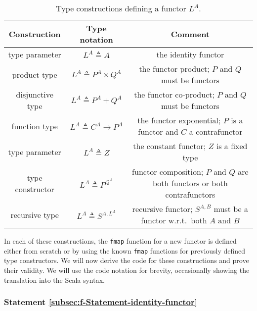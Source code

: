 \begin{table}
\begin{centering}
\begin{tabular}{|c|c|c|}
\hline 
\textbf{\small{}Construction} & \textbf{\small{}Type notation} & \textbf{\small{}Comment}\tabularnewline
\hline 
\hline 
{\footnotesize{}type parameter} & {\footnotesize{}$L^{A}\triangleq A$} & {\footnotesize{}the identity functor}\tabularnewline
\hline 
{\footnotesize{}product type} & {\footnotesize{}$L^{A}\triangleq P^{A}\times Q^{A}$} & {\footnotesize{}the functor product; $P$ and $Q$ must be functors}\tabularnewline
\hline 
{\footnotesize{}disjunctive type} & {\footnotesize{}$L^{A}\triangleq P^{A}+Q^{A}$} & {\footnotesize{}the functor co-product; $P$ and $Q$ must be functors}\tabularnewline
\hline 
{\footnotesize{}function type} & {\footnotesize{}$L^{A}\triangleq C^{A}\rightarrow P^{A}$} & {\footnotesize{}the functor exponential; $P$ is a functor and $C$
a contrafunctor}\tabularnewline
\hline 
{\footnotesize{}type parameter} & {\footnotesize{}$L^{A}\triangleq Z$} & {\footnotesize{}the constant functor; $Z$ is a fixed type}\tabularnewline
\hline 
{\footnotesize{}type constructor} & {\footnotesize{}$L^{A}\triangleq P^{Q^{A}}$} & {\footnotesize{}functor composition; $P$ and $Q$ are both functors
or both contrafunctors}\tabularnewline
\hline 
{\footnotesize{}recursive type} & {\footnotesize{}$L^{A}\triangleq S^{A,L^{A}}$} & {\footnotesize{}recursive functor; $S^{A,B}$ must be a functor w.r.t.~both
$A$ and $B$}\tabularnewline
\hline 
\end{tabular}
\par\end{centering}
\caption{Type constructions defining a functor $L^{A}$.\label{tab:f-Functor-constructions}}
\end{table}

In each of these constructions, the \lstinline!fmap! function for
a new functor is defined either from scratch or by using the known
\lstinline!fmap! functions for previously defined type constructors.
We will now derive the code for these constructions and prove their
validity. We will use the code notation for brevity, occasionally
showing the translation into the Scala syntax.

\subsubsection{Statement \label{subsec:f-Statement-identity-functor}\ref{subsec:f-Statement-identity-functor}}

